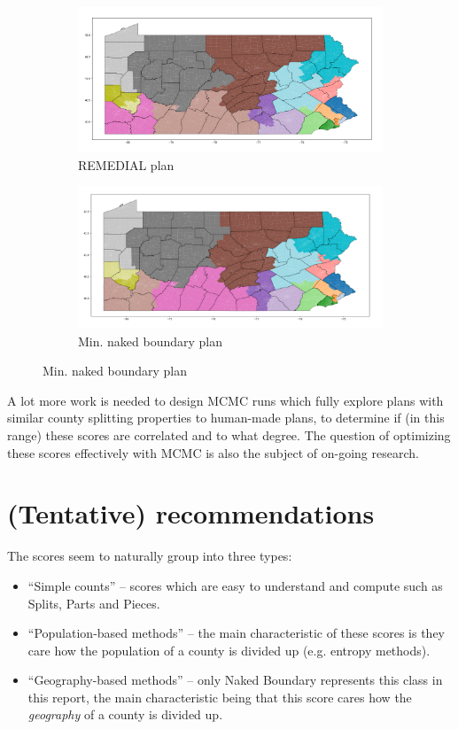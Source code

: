 \documentclass{mgggarticle}
\begin{document}
\begin{figure}[h]
	\begin{subfigure}{\textwidth}
	        \includegraphics[width=\linewidth]{figs/rem_init_bound.png}
	                 \caption{REMEDIAL plan}
	\end{subfigure}
	
	\begin{subfigure}{\textwidth}
        \includegraphics[width=\linewidth]{figs/min_naked_bound.png} 
                 \caption{Min. naked boundary plan}

	\end{subfigure}
     
\end{figure}

A lot more work is needed to design MCMC runs which fully explore plans with similar county splitting properties to human-made plans, to determine if (in this range) these scores are correlated and to what degree. The question of optimizing these scores effectively with MCMC is also the subject of on-going research.



\section{(Tentative) recommendations}
The scores seem to naturally group into three types:
\begin{itemize}
\item ``Simple counts'' -- scores which are easy to understand and compute such as Splits, Parts and Pieces.
\item ``Population-based methods'' -- the main characteristic of these scores is they care how the population of a county is divided up (e.g. entropy methods).
\item ``Geography-based methods'' -- only Naked Boundary represents this class in this report, the main characteristic being that this score cares how the \emph{geography} of a county is divided up.
\end{itemize}
\end{document}
